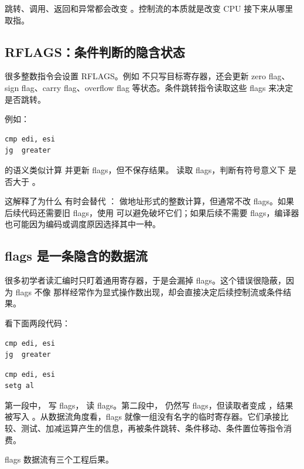 跳转、调用、返回和异常都会改变 。控制流的本质就是改变 CPU 接下来从哪里取指。

\subsection{RFLAGS：条件判断的隐含状态}

很多整数指令会设置 RFLAGS。例如  不只写目标寄存器，还会更新 zero flag、sign flag、carry flag、overflow flag 等状态。条件跳转指令读取这些 flags 来决定是否跳转。

例如：

\begin{lstlisting}
cmp edi, esi
jg  greater
\end{lstlisting}

 的语义类似计算  并更新 flags，但不保存结果。  读取 flags，判断有符号意义下  是否大于 。

这解释了为什么  有时会替代 ： 做地址形式的整数计算，但通常不改 flags。如果后续代码还需要旧 flags，使用  可以避免破坏它们；如果后续不需要 flags，编译器也可能因为编码或调度原因选择其中一种。

\subsection{flags 是一条隐含的数据流}

很多初学者读汇编时只盯着通用寄存器，于是会漏掉 flags。这个错误很隐蔽，因为 flags 不像  那样经常作为显式操作数出现，却会直接决定后续控制流或条件结果。

看下面两段代码：

\begin{lstlisting}
cmp edi, esi
jg  greater
\end{lstlisting}

\begin{lstlisting}
cmp edi, esi
setg al
\end{lstlisting}

第一段中， 写 flags， 读 flags。第二段中， 仍然写 flags，但读取者变成 ，结果被写入 。从数据流角度看，flags 就像一组没有名字的临时寄存器。它们承接比较、测试、加减运算产生的信息，再被条件跳转、条件移动、条件置位等指令消费。

flags 数据流有三个工程后果。


